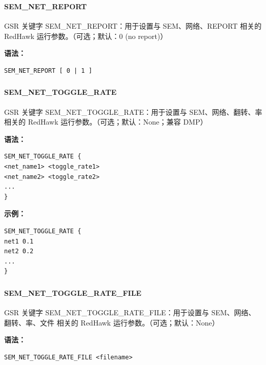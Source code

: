 \subsubsection{}
\paragraph*{SEM_NET_REPORT}

GSR 关键字 SEM_NET_REPORT：用于设置与 SEM、网络、REPORT 相关的 RedHawk 运行参数。（可选；默认：0 (no report)）

\textbf{语法：}
\begin{lstlisting}
SEM_NET_REPORT [ 0 | 1 ]
\end{lstlisting}

\subsubsection{}
\paragraph*{SEM_NET_TOGGLE_RATE}

GSR 关键字 SEM_NET_TOGGLE_RATE：用于设置与 SEM、网络、翻转、率 相关的 RedHawk 运行参数。（可选；默认：None；兼容 DMP）

\textbf{语法：}
\begin{lstlisting}
SEM_NET_TOGGLE_RATE {
<net_name1> <toggle_rate1>
<net_name2> <toggle_rate2>
...
}
\end{lstlisting}

\textbf{示例：}
\begin{lstlisting}
SEM_NET_TOGGLE_RATE {
net1 0.1
net2 0.2
...
}
\end{lstlisting}

\subsubsection{}
\paragraph*{SEM_NET_TOGGLE_RATE_FILE}

GSR 关键字 SEM_NET_TOGGLE_RATE_FILE：用于设置与 SEM、网络、翻转、率、文件 相关的 RedHawk 运行参数。（可选；默认：None）

\textbf{语法：}
\begin{lstlisting}
SEM_NET_TOGGLE_RATE_FILE <filename>
\end{lstlisting}


